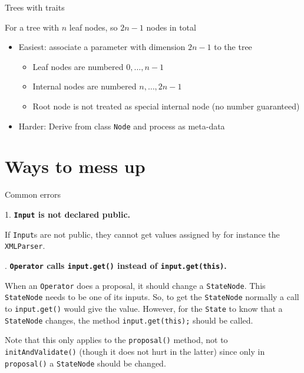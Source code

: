 \documentclass{beamer}
\theoremstyle{definition}
\begin{document}
\begin{frame}[containsverbatim]{Trees with traits}

For a tree with $n$ leaf nodes, so $2n-1$ nodes in total
\begin{itemize}
\item Easiest: associate a parameter with dimension $2n-1$ to the tree
\begin{itemize}
\item Leaf nodes are numbered $0,\ldots,n-1$
\item Internal nodes are numbered $n,\ldots,2n-1$
\item Root node is not treated as special internal node (no number guaranteed)
\end{itemize}
\item Harder: Derive from class {\tt Node} and process as meta-data
\end{itemize}

\end{frame}


\section{Ways to mess up}

\begin{frame}{Common errors}

1. {\bf\color{red} {\tt Input} is not declared public.}

If {\tt Input}s are not public, they cannot get values assigned by for
instance the {\tt XMLParser}.\vskip1cm

. {\bf\color{red} { \tt Operator} calls {\tt input.get()} instead of {\tt input.get(this)}.}

When an {\tt Operator} does a proposal, it should change a {\tt StateNode}.
This {\tt StateNode} needs to be one of its inputs. So, to get the {\tt StateNode}
normally a call to {\tt input.get()} would give the value. However, for the
{\tt State} to know that a {\tt StateNode} changes, the method {\tt input.get(this);}
should be called.

Note that this only applies to the {\tt proposal()} method, not to {\tt initAndValidate()}
(though it does not hurt in the latter) since only in {\tt proposal()} a {\tt StateNode}
should be changed.

\end{frame}
\end{document}
